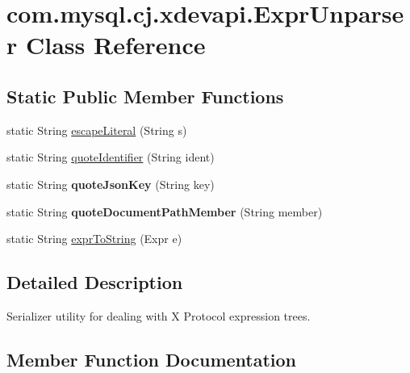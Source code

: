 \hypertarget{classcom_1_1mysql_1_1cj_1_1xdevapi_1_1_expr_unparser}{}\section{com.\+mysql.\+cj.\+xdevapi.\+Expr\+Unparser Class Reference}
\label{classcom_1_1mysql_1_1cj_1_1xdevapi_1_1_expr_unparser}
\subsection*{Static Public Member Functions}
\begin{DoxyCompactItemize}
\item 
static String \mbox{\hyperlink{classcom_1_1mysql_1_1cj_1_1xdevapi_1_1_expr_unparser_a3f26cf7209c6f96203ffdd8c650b1daa}{escape\+Literal}} (String s)
\item 
static String \mbox{\hyperlink{classcom_1_1mysql_1_1cj_1_1xdevapi_1_1_expr_unparser_a52a7b2d7c18161f35f023ee84c945a18}{quote\+Identifier}} (String ident)
\item 
\mbox{\label{classcom_1_1mysql_1_1cj_1_1xdevapi_1_1_expr_unparser_af9c17dbc6d53424297626f93e2bc1c1e}} 
static String {\bfseries quote\+Json\+Key} (String key)
\item 
\mbox{\label{classcom_1_1mysql_1_1cj_1_1xdevapi_1_1_expr_unparser_aa9069ddb4fdddddcc2839161c40a97e1}} 
static String {\bfseries quote\+Document\+Path\+Member} (String member)
\item 
static String \mbox{\hyperlink{classcom_1_1mysql_1_1cj_1_1xdevapi_1_1_expr_unparser_a1f7f5393339cc4696a3fd63c43fb2ca4}{expr\+To\+String}} (Expr e)
\end{DoxyCompactItemize}


\subsection{Detailed Description}
Serializer utility for dealing with X Protocol expression trees. 

\subsection{Member Function Documentation}
\mbox{\label{classcom_1_1mysql_1_1cj_1_1xdevapi_1_1_expr_unparser_a3f26cf7209c6f96203ffdd8c650b1daa}} 
